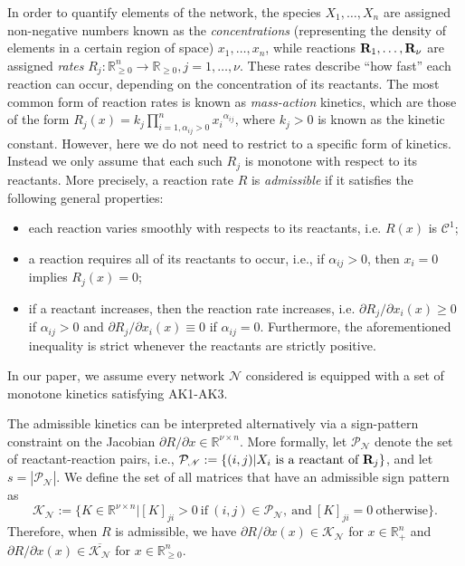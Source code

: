 \documentclass[onefignum,onetabnum]{siamonline220329}
\newcommand{\R}{{\rm \bf R}}
\newcommand{\Ns}{{\mathscr N}}
\begin{document}
 In order to quantify elements of the network, the species $X_1,\dots,X_n$ are assigned  non-negative numbers known as the \emph{concentrations} (representing the density of elements in a certain region of space) $x_1,\dots,x_n$, while reactions $\R_1,\dots,\R_\nu$ are assigned \textit{rates} $R_j:\mathbb R_{\ge 0}^n \to \mathbb R_{\ge0}, j=1,\dots,\nu$.  These rates describe ``how fast'' each reaction can occur, depending on the concentration of its reactants. The most common form of reaction rates is known as \textit{mass-action} kinetics, which are those of the form $R_j(x) = {k_j} \prod_{i=1,\alpha_{ij}>0}^n  {x_i}^{\alpha_{ij}}$, where $k_j>0$ is known as the kinetic constant. However, here we do not need to restrict to a specific form of kinetics. Instead we only assume that each such $R_j$ is monotone with respect to its reactants. More precisely, a reaction rate $R$ is \textit{admissible} if it satisfies the following general properties: \begin{itemize}
  \item[{\bf AK1:}] each reaction varies smoothly with respects to its reactants, i.e{.} $R(x)$ is $\mathscr C^1$;
  \item[{\bf AK2:}] a reaction requires all of its reactants to occur, i.e{.},  if $\alpha_{ij}>0$, then $x_i=0$ implies  $R_j(x)=0$; %
  \item[{\bf AK3:}] if a reactant increases, then the reaction rate increases, i.e{.} ${\partial R_j}/{\partial x_i}(x) \ge 0$ if $\alpha_{ij}>0$ and ${\partial R_j}/{\partial x_i}(x)\equiv 0$ if $\alpha_{ij}=0$. Furthermore, the aforementioned inequality is strict whenever the reactants are strictly positive.
 \end{itemize}
 In our paper, we assume every network $\Ns$ considered is equipped with a set of monotone kinetics satisfying AK1-AK3.   
 
 The admissible kinetics can be interpreted alternatively via a sign-pattern constraint on the Jacobian $\partial R/\partial x \in \mathbb R^{\nu\times n}$. More formally, let $\mathcal P_\Ns$ denote the set of reactant-reaction pairs, i.e., $\mathcal P_\Ns:=\{(i,j)| X_i~\mbox{is a reactant of}~\R_j\}$, and let $s=|\mathcal P_\Ns|$.  We define the set of all matrices that have an admissible sign pattern as \begin{equation}\label{K_def}\mathcal K_\Ns := \{ K \in \mathbb R^{\nu \times n} | [K]_{ji}>0~\mbox{if}~(i,j)\in\mathcal P_\Ns,~\mbox{and}~[K]_{ji}=0~\mbox{otherwise}\}. \end{equation} Therefore, when $R$ is admissible, we have  $\partial R/\partial x(x) \in \mathcal K_\Ns$ for $x\in\mathbb R_{+}^{n}$ and $\partial R/\partial x(x) \in \overline{\mathcal K_\Ns}$ for $x\in\mathbb R_{\ge 0}^{n}$.
 
\end{document}

